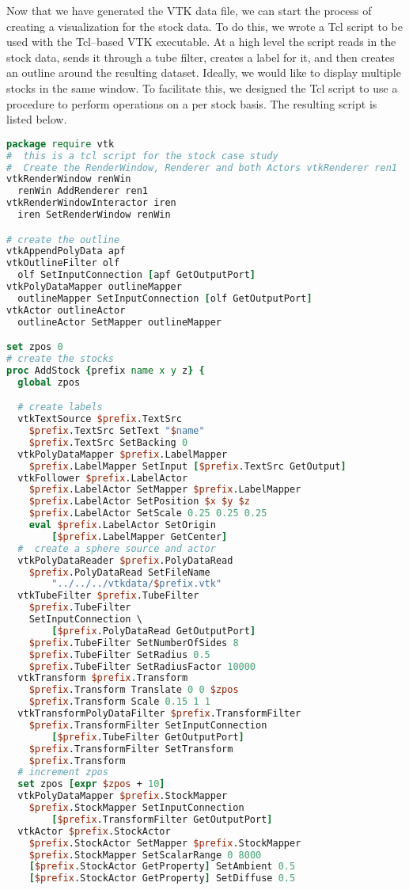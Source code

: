 Now that we have generated the VTK data file, we can start the process of creating a visualization for the stock data. To do this, we wrote a Tcl script to be used with the Tcl--based VTK executable. At a high level the script reads in the stock data, sends it through a tube filter, creates a label for it, and then creates an outline around the resulting dataset. Ideally, we would like to display multiple stocks in the same window. To facilitate this, we designed the Tcl script to use a procedure to perform operations on a per stock basis. The resulting script is listed below.


\begin{lstlisting}[language=TCL, caption={Tcl script for stock case study.}]
package require vtk
#  this is a tcl script for the stock case study
#  Create the RenderWindow, Renderer and both Actors vtkRenderer ren1
vtkRenderWindow renWin
  renWin AddRenderer ren1
vtkRenderWindowInteractor iren
  iren SetRenderWindow renWin

# create the outline
vtkAppendPolyData apf
vtkOutlineFilter olf
  olf SetInputConnection [apf GetOutputPort]
vtkPolyDataMapper outlineMapper
  outlineMapper SetInputConnection [olf GetOutputPort]
vtkActor outlineActor
  outlineActor SetMapper outlineMapper

set zpos 0
# create the stocks
proc AddStock {prefix name x y z} {
  global zpos

  # create labels
  vtkTextSource $prefix.TextSrc
    $prefix.TextSrc SetText "$name"
    $prefix.TextSrc SetBacking 0
  vtkPolyDataMapper $prefix.LabelMapper
    $prefix.LabelMapper SetInput [$prefix.TextSrc GetOutput]
  vtkFollower $prefix.LabelActor
    $prefix.LabelActor SetMapper $prefix.LabelMapper
    $prefix.LabelActor SetPosition $x $y $z
    $prefix.LabelActor SetScale 0.25 0.25 0.25
    eval $prefix.LabelActor SetOrigin
        [$prefix.LabelMapper GetCenter]
  #  create a sphere source and actor
  vtkPolyDataReader $prefix.PolyDataRead
    $prefix.PolyDataRead SetFileName
		"../../../vtkdata/$prefix.vtk"
  vtkTubeFilter $prefix.TubeFilter
    $prefix.TubeFilter
    SetInputConnection \
        [$prefix.PolyDataRead GetOutputPort]
	$prefix.TubeFilter SetNumberOfSides 8
	$prefix.TubeFilter SetRadius 0.5
    $prefix.TubeFilter SetRadiusFactor 10000
  vtkTransform $prefix.Transform
	$prefix.Transform Translate 0 0 $zpos
	$prefix.Transform Scale 0.15 1 1
  vtkTransformPolyDataFilter $prefix.TransformFilter
    $prefix.TransformFilter SetInputConnection
        [$prefix.TubeFilter GetOutputPort]
    $prefix.TransformFilter SetTransform
    $prefix.Transform
  # increment zpos
  set zpos [expr $zpos + 10]
  vtkPolyDataMapper $prefix.StockMapper
    $prefix.StockMapper SetInputConnection
        [$prefix.TransformFilter GetOutputPort]
  vtkActor $prefix.StockActor
    $prefix.StockActor SetMapper $prefix.StockMapper
    $prefix.StockMapper SetScalarRange 0 8000
    [$prefix.StockActor GetProperty] SetAmbient 0.5
    [$prefix.StockActor GetProperty] SetDiffuse 0.5


\end{lstlisting}
